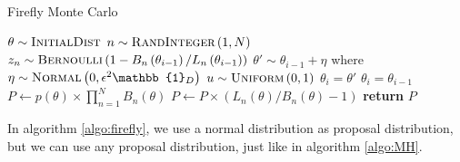 \documentclass{article}
\theoremstyle{definition}
\begin{document}
\begin{algorithm}[H]
    \caption{Firefly Monte Carlo}
    \label{algo:firefly}
    \begin{algorithmic}[1] %
        \State $\theta \sim \textsc{InitialDist}$ 
        \State $n\sim \textsc{RandInteger}\left(1, N\right)$
        \State $z_n \sim \textsc{Bernoulli}\left(1 - B_n\left(\theta_{i - 1}\right)/L_n\left(\theta_{i-1}\right)\right) $
        \EndFor
        \State$\theta' \sim \theta_{i-1} + \eta$ where $\eta\sim \textsc{Normal}\left(0, \epsilon^2 \mathbb{1}_D\right)$
        \State $u\sim \textsc{Uniform}\left(0,1\right)$
        \State $\theta_i = \theta'$
        \Else 
        \State $\theta_i = \theta_{i-1}$
         \EndIf
         \EndFor
         \\
            \State $P \gets p\left(\theta\right)\times \prod_{n=1}^N B_n\left(\theta\right)$
                \State $P\gets P \times \left(L_n\left(\theta\right)/B_n\left(\theta\right) - 1\right)$
                \EndFor
           \State \textbf{return} $P$
        \EndFunction
    \end{algorithmic}
\end{algorithm}
In algorithm \ref{algo:firefly}, we use a normal distribution as proposal distribution, but we can use any proposal distribution, just like in algorithm \ref{algo:MH}. 
\end{document}
